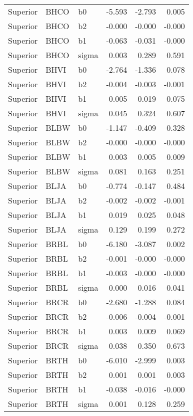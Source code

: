 \begin{table}[ht]
\begin{center}
\begin{tabular}{lllrrr}
  Superior & BHCO & b0 & -5.593 & -2.793 & 0.005 \\ 
  Superior & BHCO & b2 & -0.000 & -0.000 & -0.000 \\ 
  Superior & BHCO & b1 & -0.063 & -0.031 & -0.000 \\ 
  Superior & BHCO & sigma & 0.003 & 0.289 & 0.591 \\ 
  Superior & BHVI & b0 & -2.764 & -1.336 & 0.078 \\ 
  Superior & BHVI & b2 & -0.004 & -0.003 & -0.001 \\ 
  Superior & BHVI & b1 & 0.005 & 0.019 & 0.075 \\ 
  Superior & BHVI & sigma & 0.045 & 0.324 & 0.607 \\ 
  Superior & BLBW & b0 & -1.147 & -0.409 & 0.328 \\ 
  Superior & BLBW & b2 & -0.000 & -0.000 & -0.000 \\ 
  Superior & BLBW & b1 & 0.003 & 0.005 & 0.009 \\ 
  Superior & BLBW & sigma & 0.081 & 0.163 & 0.251 \\ 
  Superior & BLJA & b0 & -0.774 & -0.147 & 0.484 \\ 
  Superior & BLJA & b2 & -0.002 & -0.002 & -0.001 \\ 
  Superior & BLJA & b1 & 0.019 & 0.025 & 0.048 \\ 
  Superior & BLJA & sigma & 0.129 & 0.199 & 0.272 \\ 
  Superior & BRBL & b0 & -6.180 & -3.087 & 0.002 \\ 
  Superior & BRBL & b2 & -0.001 & -0.000 & -0.000 \\ 
  Superior & BRBL & b1 & -0.003 & -0.000 & -0.000 \\ 
  Superior & BRBL & sigma & 0.000 & 0.016 & 0.041 \\ 
  Superior & BRCR & b0 & -2.680 & -1.288 & 0.084 \\ 
  Superior & BRCR & b2 & -0.006 & -0.004 & -0.001 \\ 
  Superior & BRCR & b1 & 0.003 & 0.009 & 0.069 \\ 
  Superior & BRCR & sigma & 0.038 & 0.350 & 0.673 \\ 
  Superior & BRTH & b0 & -6.010 & -2.999 & 0.003 \\ 
  Superior & BRTH & b2 & 0.001 & 0.001 & 0.003 \\ 
  Superior & BRTH & b1 & -0.038 & -0.016 & -0.000 \\ 
  Superior & BRTH & sigma & 0.001 & 0.128 & 0.259 \\ 

\end{tabular}
\end{center}
\end{table}
